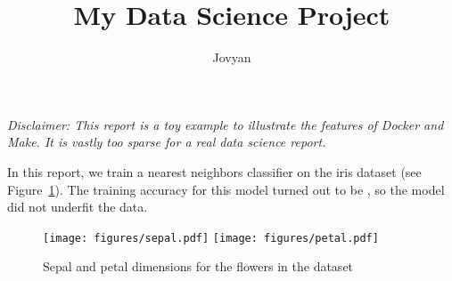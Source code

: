 \documentclass{article}
\begin{document}
\title{My Data Science Project}
\author{Jovyan}
\maketitle

\textit{Disclaimer: This report is a toy example to illustrate the features of Docker and Make. It is vastly too sparse for a real data science report.}

In this report, we train a nearest neighbors classifier on the iris dataset (see Figure~\ref{fig:flowers}). The training accuracy for this model turned out to be , so the model did not underfit the data.

\begin{figure}[h!]
    \centering
    \texttt{[image: figures/sepal.pdf]}
    \texttt{[image: figures/petal.pdf]}
    \caption{Sepal and petal dimensions for the flowers in the dataset}
    \label{fig:flowers}
\end{figure}
\end{document}
